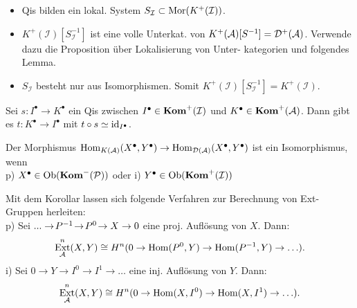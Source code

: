 \documentclass{cheat-sheet}
\newcommand{\CCC}[1]{{#1}^{\bullet}} %
\DeclareMathOperator{\Ext}{Ext} %
\newcommand{\Inj}{\mathcal{I}} %
\newcommand{\Proj}{\mathcal{P}} %
\begin{document}
\begin{beweisidee}
  \begin{itemize}
    \item Qis bilden ein lokal. System $S_\Inj \subset \Mor(K^+(\Inj))$.
    \item $K^+(\Inj)[S_\Inj^{-1}]$ ist eine volle Unterkat. von $K^+(\mathcal{A})[S^{-1}] = \mathcal{D}^+(\mathcal{A})$.
    Verwende dazu die Proposition über Lokalisierung von Unter- kategorien und folgendes Lemma.
    \item $S_\Inj$ besteht nur aus Isomorphismen. Somit $K^+(\Inj)[S_\Inj^{-1}] = K^+(\Inj)$.
  \end{itemize}
\end{beweisidee}

\begin{lem}
  Sei $s \!:\! \CCC{I} \!\to\! \CCC{K}$ ein Qis zwischen $\CCC{I} \in \Kom^+(\Inj)$ und $\CCC{K} \in \Kom^+(\Aat)$.
  Dann gibt es $t : \CCC{K} \to \CCC{I}$ mit $t \circ s \simeq \id_{\CCC{I}}$.
\end{lem}

\begin{kor}
  Der Morphismus \enspace $\Hom_{K(\Aat)}(\CCC{X}, \CCC{Y}) \to \Hom_{\Der(\Aat)}(\CCC{X}, \CCC{Y})$ ist ein Isomorphismus, wenn \\[2pt]
  p) \enspace $\CCC{X} \in \Ob(\Kom^-(\Proj))$ oder \quad
  i) \enspace $\CCC{Y} \in \Ob(\Kom^+(\Inj))$
\end{kor}

\begin{bem}
  Mit dem Korollar lassen sich folgende Verfahren zur Berechnung von Ext-Gruppen herleiten: \\[2pt]
  p) \enspace Sei $... \to\! P^{-1} \!\to\! P^0 \!\to X \to 0$ eine proj. Auflösung von $X$. Dann:
  \[ \Ext^n_\Aat(X, Y) \cong H^n(0 \to \Hom(P^0, Y) \to \Hom(P^{-1}, Y) \to \ldots). \]
  i) \enspace Sei $0 \to Y \to I^0 \to I^1 \to \ldots$ eine inj. Auflösung von $Y$. Dann:
  \[ \Ext^n_\Aat(X, Y) \cong H^n(0 \to \Hom(X, I^0) \to \Hom(X, I^1) \to \ldots). \]
\end{bem}

\end{document}
